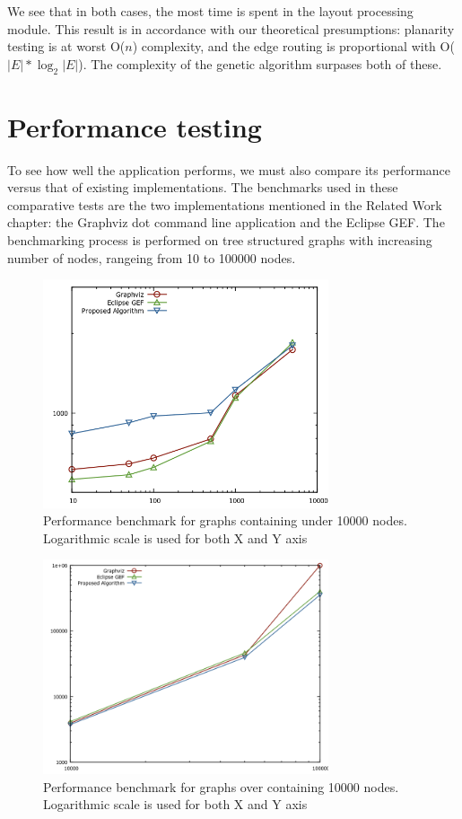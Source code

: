 We see that in both cases, the most time is spent in the layout processing module. This result is in 
accordance with our theoretical presumptions: planarity testing is at worst O(${n}$) complexity, and the edge 
routing is proportional with O($|E| * \log_2 |E|$). The complexity of the genetic algorithm surpases both of 
these.

\section{Performance testing}

To see how well the application performs, we must also compare its performance versus that of existing 
implementations. The benchmarks used in these comparative tests are the two implementations mentioned in the 
Related Work chapter: the Graphviz dot command line application and the Eclipse GEF. The benchmarking process 
is performed on tree structured graphs with increasing number of nodes, rangeing from 10 to 100000 nodes.

\begin{figure}[ht] \centering
\includegraphics[width=0.75\textwidth]{img/results/under10000.png}
\caption{Performance benchmark for graphs containing under 10000 nodes. Logarithmic scale is used for both X and Y axis} \end{figure}

\begin{figure}[ht] \centering
\includegraphics[width=0.75\textwidth]{img/results/over10000.png}
\caption{Performance benchmark for graphs over containing 10000 nodes. Logarithmic scale is used for both X and Y axis} \end{figure}

